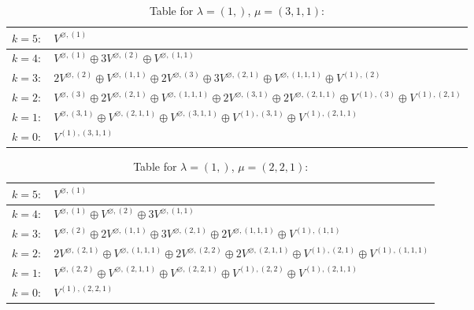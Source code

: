 \documentclass[a4paper,12pt]{article}
\begin{document}
\renewcommand{\arraystretch}{1.6} 
\begin{table}[H]
\centering
\caption{Table for $\lambda = (1,)$, $\mu = (3, 1, 1)$:}
\begin{tabular}{|>{\centering\arraybackslash}p{15cm}|}
\hline
 $k = 5: \quad V^{\varnothing, (1)} $ \\ \hline
 $k = 4: \quad V^{\varnothing, (1)} \oplus 3 V^{\varnothing, (2)} \oplus V^{\varnothing, (1, 1)} $ \\ \hline
 $k = 3: \quad 2 V^{\varnothing, (2)} \oplus V^{\varnothing, (1, 1)} \oplus 2 V^{\varnothing, (3)} \oplus 3 V^{\varnothing, (2, 1)} \oplus V^{\varnothing, (1, 1, 1)} \oplus V^{(1), (2)} $ \\ \hline
 $k = 2: \quad V^{\varnothing, (3)} \oplus 2 V^{\varnothing, (2, 1)} \oplus V^{\varnothing, (1, 1, 1)} \oplus 2 V^{\varnothing, (3, 1)} \oplus 2 V^{\varnothing, (2, 1, 1)} \oplus V^{(1), (3)} \oplus V^{(1), (2, 1)} $ \\ \hline
 $k = 1: \quad V^{\varnothing, (3, 1)} \oplus V^{\varnothing, (2, 1, 1)} \oplus V^{\varnothing, (3, 1, 1)} \oplus V^{(1), (3, 1)} \oplus V^{(1), (2, 1, 1)} $ \\ \hline
 $k = 0: \quad V^{(1), (3, 1, 1)} $ \\ \hline
\end{tabular}
\end{table}

\renewcommand{\arraystretch}{1.6} 
\begin{table}[H]
\centering
\caption{Table for $\lambda = (1,)$, $\mu = (2, 2, 1)$:}
\begin{tabular}{|>{\centering\arraybackslash}p{15cm}|}
\hline
 $k = 5: \quad V^{\varnothing, (1)} $ \\ \hline
 $k = 4: \quad V^{\varnothing, (1)} \oplus V^{\varnothing, (2)} \oplus 3 V^{\varnothing, (1, 1)} $ \\ \hline
 $k = 3: \quad V^{\varnothing, (2)} \oplus 2 V^{\varnothing, (1, 1)} \oplus 3 V^{\varnothing, (2, 1)} \oplus 2 V^{\varnothing, (1, 1, 1)} \oplus V^{(1), (1, 1)} $ \\ \hline
 $k = 2: \quad 2 V^{\varnothing, (2, 1)} \oplus V^{\varnothing, (1, 1, 1)} \oplus 2 V^{\varnothing, (2, 2)} \oplus 2 V^{\varnothing, (2, 1, 1)} \oplus V^{(1), (2, 1)} \oplus V^{(1), (1, 1, 1)} $ \\ \hline
 $k = 1: \quad V^{\varnothing, (2, 2)} \oplus V^{\varnothing, (2, 1, 1)} \oplus V^{\varnothing, (2, 2, 1)} \oplus V^{(1), (2, 2)} \oplus V^{(1), (2, 1, 1)} $ \\ \hline
 $k = 0: \quad V^{(1), (2, 2, 1)} $ \\ \hline
\end{tabular}
\end{table}
\end{document}

